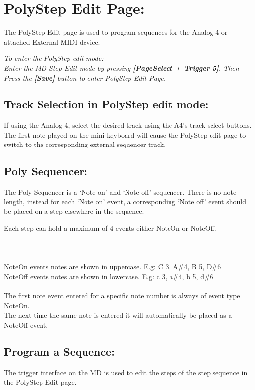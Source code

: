 \chapter{PolyStep Edit Page:}
The PolyStep Edit page is used to program sequences for the Analog 4 or attached External MIDI device.


\textit{To enter the PolyStep edit mode:\\Enter the MD Step Edit mode by pressing \textbf{[PageSelect + Trigger 5]}. Then Press the \textbf{[Save]} button to enter PolyStep Edit Page.}\\
\section{Track Selection in PolyStep edit mode:}
If using the Analog 4, select the desired track using the A4’s track select buttons. The first note played on the mini keyboard will cause the PolyStep edit page to switch to  the corresponding external sequencer track.
\section{Poly Sequencer: }
The Poly Sequencer is a ‘Note on’ and ‘Note off’ sequencer. There is no note length, instead for each ‘Note on’ event, a corresponding ‘Note off’ event should be placed on a step elsewhere in the sequence.

Each step can hold a maximum of 4 events either NoteOn or NoteOff.\\\\
\\
\\
NoteOn events notes are shown in uppercase. E.g: C 3, A\#4, B 5, D\#6
\\NoteOff events notes are shown in lowercase. E.g: c 3, a\#4, b 5, d\#6
\\\\
The first note event entered for a specific note number is always of event type NoteOn.\\
The next time the same note is entered it will automatically be placed as a NoteOff event.

\section{Program a Sequence: }
The trigger interface on the MD is used to edit the steps of the step sequence in the PolyStep Edit page.

